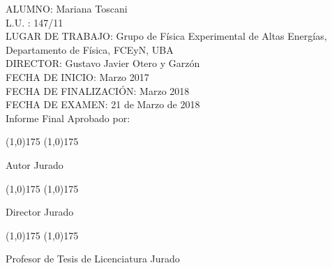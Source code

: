 {
\noindent
ALUMNO: Mariana Toscani \\
L.U. : 147/11 \\
LUGAR DE TRABAJO: Grupo de Física Experimental de Altas Energías,\\ Departamento de Física, FCEyN, UBA \\
DIRECTOR: Gustavo Javier Otero y Garzón \\
FECHA DE INICIO: Marzo 2017 \\
FECHA DE FINALIZACIÓN: Marzo 2018 \\
FECHA DE EXAMEN: 21 de Marzo de 2018 \\
Informe Final Aprobado por: \\
}

\vspace{5.5cm}

\line(1,0){175} \hspace{60pt} \line(1,0){175}

Autor \hspace{205pt} Jurado

\vspace{2cm}

\line(1,0){175} \hspace{60pt} \line(1,0){175}

Director \hspace{195pt} Jurado

\vspace{2cm}

\line(1,0){175} \hspace{60pt} \line(1,0){175}

Profesor de Tesis de Licenciatura \hspace{75pt} Jurado

\mbox{}

